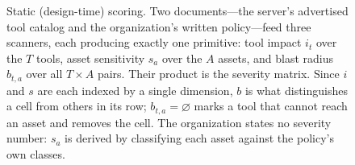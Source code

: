 \begin{figure}[t]
\caption{Static (design-time) scoring. Two documents---the server's advertised
tool catalog and the organization's written policy---feed three scanners, each
producing exactly one primitive: tool impact $i_t$ over the $T$ tools, asset
sensitivity $s_a$ over the $A$ assets, and blast radius $b_{t,a}$ over all
$T\!\times\!A$ pairs. Their product is the severity matrix. Since $i$ and $s$ are
each indexed by a single dimension, $b$ is what distinguishes a cell from others
in its row; $b_{t,a}=\varnothing$ marks a tool that cannot reach an asset and
removes the cell. The organization states no severity number: $s_a$ is derived by
classifying each asset against the policy's own classes.}
\label{fig:static}
\end{figure}
